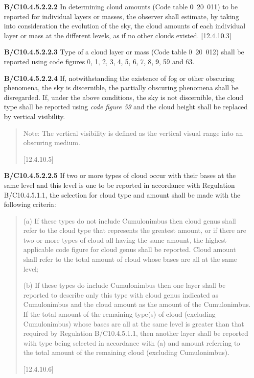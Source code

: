 \textbf{B/C10.4.5.2.2.2} In determining cloud amounts (Code table 0~20~011) to be reported for individual layers or masses, the observer shall estimate, by taking into consideration the evolution of the sky, the cloud amounts of each individual layer or mass at the different levels, as if no other clouds existed. {[}12.4.10.3{]}

\textbf{B/C10.4.5.2.2.3} Type of a cloud layer or mass (Code table 0~20~012) shall be reported using code figures 0, 1, 2, 3, 4, 5, 6, 7, 8, 9, 59 and 63.

\textbf{B/C10.4.5.2.2.4} If, notwithstanding the existence of fog or other obscuring phenomena, the sky is discernible, the partially obscuring phenomena shall be disregarded. If, under the above conditions, the sky is not discernible, the cloud type shall be reported using \emph{code figure 59} and the cloud height shall be replaced by vertical visibility.

\begin{quote}
Note: The vertical visibility is defined as the vertical visual range into an obscuring medium.

{[}12.4.10.5{]}
\end{quote}

\textbf{B/C10.4.5.2.2.5} If two or more types of cloud occur with their bases at the same level and this level is one to be reported in accordance with Regulation B/C10.4.5.1.1, the selection for cloud type and amount shall be made with the following criteria:

\begin{quote}
(a) If these types do not include Cumulonimbus then cloud genus shall refer to the cloud type that represents the greatest amount, or if there are two or more types of cloud all having the same amount, the highest applicable code figure for cloud genus shall be reported. Cloud amount shall refer to the total amount of cloud whose bases are all at the same level;

(b) If these types do include Cumulonimbus then one layer shall be reported to describe only this type with cloud genus indicated as Cumulonimbus and the cloud amount as the amount of the Cumulonimbus. If the total amount of the remaining type(s) of cloud (excluding Cumulonimbus) whose bases are all at the same level is greater than that required by Regulation B/C10.4.5.1.1, then another layer shall be reported with type being selected in accordance with (a) and amount referring to the total amount of the remaining cloud (excluding Cumulonimbus).

{[}12.4.10.6{]}
\end{quote}

